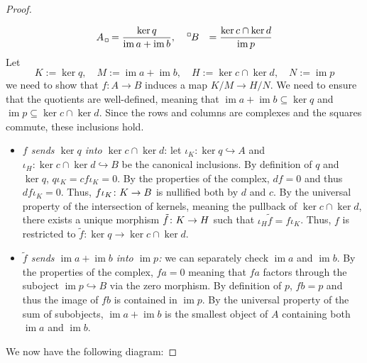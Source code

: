 \documentclass[a4paper]{article}
\DeclareMathOperator{\im}{im}
\newcommand{\bx}{{\kern.15em\line(1,0){3}\line(0,1){3}%
\raisebox{.3em}{\line(-1,0){3}\line(0,-1){3}\kern.3em}}}
\begin{document}
\begin{proof}
\begin{figure}[htbp]
\begin{minipage}[b]{0.47\textwidth}
            \vspace{0.3cm} %
        \end{minipage}
    \end{figure}
    \[
        \begin{aligned}
            A_\bx &= \frac{\ker q}{\im a + \im b}, \quad {}^\bx B &= \frac{\ker c \cap \ker d}{\im p}
        \end{aligned}
    \]
    Let \[
        K := \ker q, \quad M := \im a + \im b, \quad H := \ker c \cap \ker d, \quad N := \im p
    \]
    we need to show that \(f \colon A \to B\) induces a map
    \(K/M \to H/N\).
    We need to ensure that the quotients are well-defined, meaning that \(\im a + \im b \subseteq \ker q\) and \(\im p \subseteq \ker c \cap \ker d\).
    Since the rows and columns are complexes and the squares commute, these inclusions hold.
    \begin{itemize}
        \item \emph{\(f\) sends \(\ker q\) into \(\ker c \cap \ker d\)}:
        let \(\iota_K \colon \ker q \hookrightarrow A\) and \(\iota_H \colon \ker c \cap \ker d \hookrightarrow B\) be the canonical inclusions.
        By definition of \(q\) and \(\ker q\), \(q \iota_K = cf\iota_K = 0\).
        By the properties of the complex, \(df = 0\) and thus \(df\iota_K = 0\).
        Thus, \(f\iota_K \colon K \to B\) is nullified both by \(d\) and \(c\).
        By the universal property of the intersection of kernels, meaning the pullback of \(\ker c \cap \ker d\),
        there exists a unique morphism \(\tilde f \colon K \to H\) such that
        \(\iota_H \tilde f = f\iota_K\). Thus, \(f\) is restricted to \(\tilde f \colon \ker q \to \ker c \cap \ker d\).
        \item \emph{\(\tilde f\) sends \(\im a + \im b\) into \(\im p\):}
        we can separately check \(\im a\) and \(\im b\).
        By the properties of the complex, \(fa = 0\) meaning that \(fa\) factors through the suboject \(\im p \hookrightarrow B\)
        via the zero morphism.
        By definition of \(p\), \(fb = p\) and thus the image of \(fb\) is contained in \(\im p\).
        By the universal property of the sum of subobjects, \(\im a + \im b\) is the smallest object
        of \(A\) containing both \(\im a\) and \(\im b\).
    \end{itemize}
    We now have the following diagram:

\end{proof}
\end{document}
